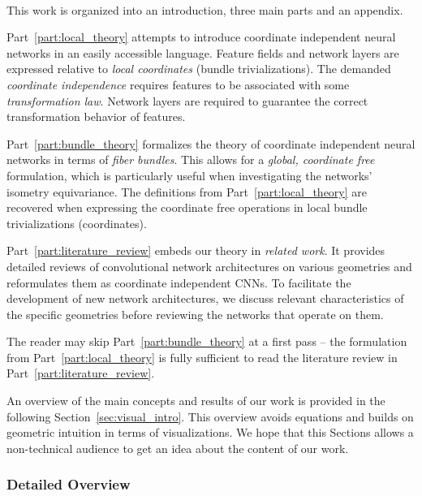 

\setcounter{tocdepth}{2}
\tableofcontents

~ %

This work is organized into an introduction, three main parts and an appendix.

Part~\ref{part:local_theory} attempts to introduce coordinate independent neural networks in an easily accessible language.
Feature fields and network layers are expressed relative to \emph{local coordinates} (bundle trivializations).
The demanded \emph{coordinate independence} requires features to be associated with some \emph{transformation law}.
Network layers are required to guarantee the correct transformation behavior of features.

Part~\ref{part:bundle_theory} formalizes the theory of coordinate independent neural networks in terms of \emph{fiber bundles}.
This allows for a \emph{global, coordinate free} formulation, which is particularly useful when investigating the networks' isometry equivariance.
The definitions from Part~\ref{part:local_theory} are recovered when expressing the coordinate free operations in local bundle trivializations (coordinates).

Part~\ref{part:literature_review} embeds our theory in \emph{related work}.
It provides detailed reviews of convolutional network architectures on various geometries and reformulates them as coordinate independent CNNs.
To facilitate the development of new network architectures, we discuss relevant characteristics of the specific geometries before reviewing the networks that operate on them.

The reader may skip Part~\ref{part:bundle_theory} at a first pass
-- the formulation from Part~\ref{part:local_theory} is fully sufficient to read the literature review in Part~\ref{part:literature_review}.

An overview of the main concepts and results of our work is provided in the following Section~\ref{sec:visual_intro}.
This overview avoids equations and builds on geometric intuition in terms of visualizations.
We hope that this Sections allows a non-technical audience to get an idea about the content of our work.






\subsubsection*{Detailed Overview}


